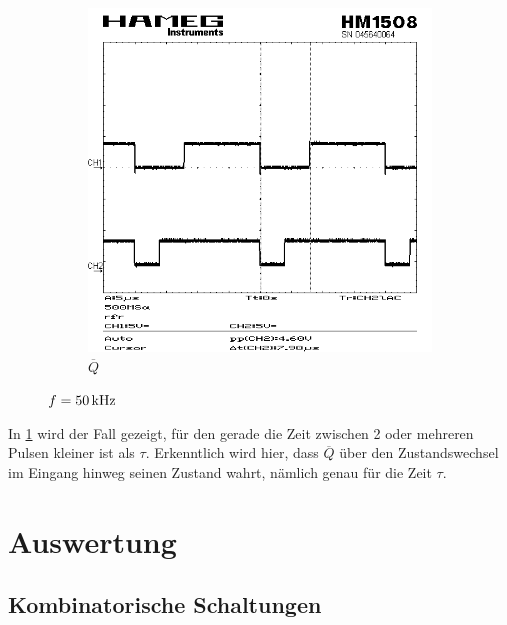 \documentclass[numbers=noenddot,12pt,a4paper]{scrartcl}
\newcommand{\nicht}[1]{\overline{#1}}
\begin{document}
\begin{figure}[H]
\begin{subfigure}[b]{0.48\textwidth}
\includegraphics[width=\textwidth]{seq150khzqquer.png}
\caption{$\nicht{Q}$}
\end{subfigure}
\caption{$f=\unit[50]{kHz}$} \label{img:50khz}
\end{figure}
In \ref{img:50khz} wird der Fall gezeigt, für den gerade die Zeit zwischen 2 oder mehreren Pulsen kleiner ist als $\tau$. Erkenntlich wird hier, dass $\nicht{Q}$ über den Zustandswechsel im Eingang hinweg seinen Zustand wahrt, nämlich genau für die Zeit $\tau$.
\section{Auswertung}
\subsection{Kombinatorische Schaltungen}
\end{document}
